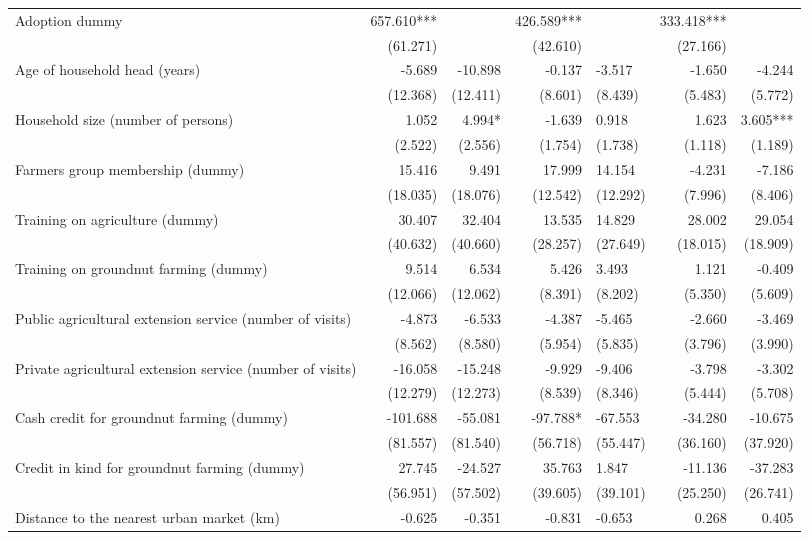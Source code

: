 \documentclass[
]{article}
\begin{document}
\begin{landscape}
\begin{longtable}[t]{lrrrlrr}
\endfoot
\bottomrule
\endlastfoot
Adoption dummy & 657.610*** &  & 426.589*** &  & 333.418*** & \\
 & (61.271) &  & (42.610) &  & (27.166) & \\
Age of household head (years) & -5.689 & -10.898 & -0.137 & -3.517 & -1.650 & -4.244\\
 & (12.368) & (12.411) & (8.601) & (8.439) & (5.483) & (5.772)\\
Household size (number of persons) & 1.052 & 4.994* & -1.639 & 0.918 & 1.623 & 3.605***\\
\addlinespace
 & (2.522) & (2.556) & (1.754) & (1.738) & (1.118) & (1.189)\\
Farmers group membership (dummy) & 15.416 & 9.491 & 17.999 & 14.154 & -4.231 & -7.186\\
 & (18.035) & (18.076) & (12.542) & (12.292) & (7.996) & (8.406)\\
Training on agriculture (dummy) & 30.407 & 32.404 & 13.535 & 14.829 & 28.002 & 29.054\\
 & (40.632) & (40.660) & (28.257) & (27.649) & (18.015) & (18.909)\\
\addlinespace
Training on groundnut farming (dummy) & 9.514 & 6.534 & 5.426 & 3.493 & 1.121 & -0.409\\
 & (12.066) & (12.062) & (8.391) & (8.202) & (5.350) & (5.609)\\
Public agricultural extension service (number of visits) & -4.873 & -6.533 & -4.387 & -5.465 & -2.660 & -3.469\\
 & (8.562) & (8.580) & (5.954) & (5.835) & (3.796) & (3.990)\\
Private agricultural extension service (number of visits) & -16.058 & -15.248 & -9.929 & -9.406 & -3.798 & -3.302\\
\addlinespace
 & (12.279) & (12.273) & (8.539) & (8.346) & (5.444) & (5.708)\\
Cash credit for groundnut farming (dummy) & -101.688 & -55.081 & -97.788* & -67.553 & -34.280 & -10.675\\
 & (81.557) & (81.540) & (56.718) & (55.447) & (36.160) & (37.920)\\
Credit in kind for groundnut farming (dummy) & 27.745 & -24.527 & 35.763 & 1.847 & -11.136 & -37.283\\
 & (56.951) & (57.502) & (39.605) & (39.101) & (25.250) & (26.741)\\
\addlinespace
Distance to the nearest urban market (km) & -0.625 & -0.351 & -0.831 & -0.653 & 0.268 & 0.405\\

\end{longtable}
\end{landscape}
\end{document}
